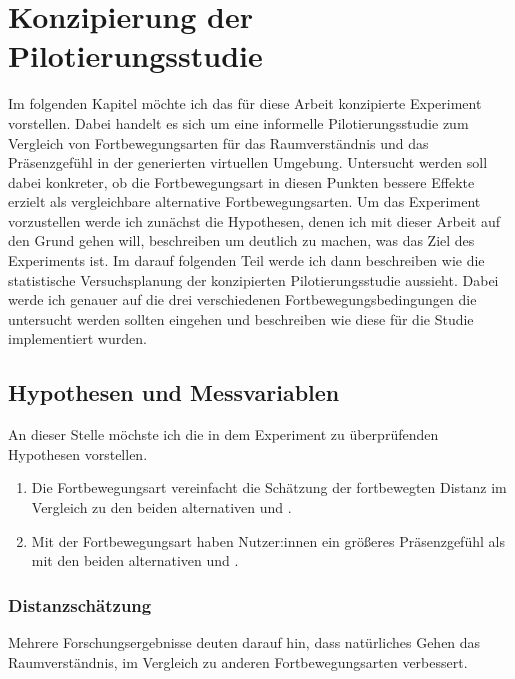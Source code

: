 \chapter{Konzipierung der Pilotierungsstudie}\label{chapter:experiment}
    Im folgenden Kapitel möchte ich das für diese Arbeit konzipierte Experiment vorstellen. Dabei handelt es sich um eine informelle Pilotierungsstudie zum Vergleich von Fortbewegungsarten für das Raumverständnis und das Präsenzgefühl in der generierten virtuellen Umgebung. Untersucht werden soll dabei konkreter, ob die Fortbewegungsart  in diesen Punkten bessere Effekte erzielt als vergleichbare alternative Fortbewegungsarten.
    Um das Experiment vorzustellen werde ich zunächst die Hypothesen, denen ich mit dieser Arbeit auf den Grund gehen will, beschreiben um deutlich zu machen, was das Ziel des Experiments ist.
    Im darauf folgenden Teil werde ich dann beschreiben wie die statistische Versuchsplanung der konzipierten Pilotierungsstudie aussieht. Dabei werde ich genauer auf die drei verschiedenen Fortbewegungsbedingungen die untersucht werden sollten eingehen und beschreiben wie diese für die Studie implementiert wurden.

    \section{Hypothesen und Messvariablen}
        An dieser Stelle möchste ich die in dem Experiment zu überprüfenden Hypothesen vorstellen.

        \begin{enumerate}
            \item Die  Fortbewegungsart vereinfacht die Schätzung der fortbewegten Distanz im Vergleich zu den beiden alternativen  und .

            \item Mit der  Fortbewegungsart haben Nutzer:innen ein größeres Präsenzgefühl als mit den beiden alternativen  und .
        \end{enumerate}

        \subsection{Distanzschätzung}
            Mehrere Forschungsergebnisse deuten darauf hin, dass natürliches Gehen das Raumverständnis, im Vergleich zu anderen Fortbewegungsarten verbessert. \cite{langbehn-vergleich-2018,peck-vergleich-2011, walking-improves-map-building} %

